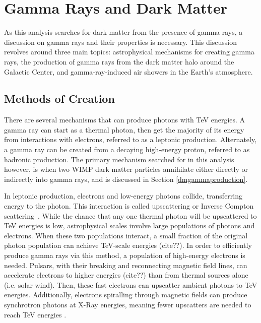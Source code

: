\cleartooddpage[\thispagestyle{empty}]
\chapter{Gamma Rays and Dark Matter}

As this analysis searches for dark matter from the presence of gamma rays, a discussion on gamma rays and their properties is necessary.
This discussion revolves around three main topics: astrophysical mechanisms for creating gamma rays, the production of gamma rays from the dark matter halo around the Galactic Center, and gamma-ray-induced air showers in the Earth's atmosphere.

\section{Methods of Creation}

  There are several mechanisms that can produce photons with TeV energies.
  A gamma ray can start as a thermal photon, then get the majority of its energy from interactions with electrons, referred to as a leptonic production.
  Alternately, a gamma ray can be created from a decaying high-energy proton, referred to as hadronic production.
  The primary mechanism searched for in this analysis however, is when two WIMP dark matter particles annihilate either directly or indirectly into gamma rays, and is discussed in Section \ref{dmgammaproduction}.

  In leptonic production, electrons and low-energy photons collide, transferring energy to the photon.
  This interaction is called upscattering or Inverse Compton scattering~\cite{compton_effect}.
  While the chance that any one thermal photon will be upscattered to TeV energies is low, astrophysical scales involve large populations of photons and electrons.
  When these two populations interact, a small fraction of the original photon population {\color{red}can achieve TeV-scale energies (cite??)}.
  In order to efficiently produce gamma rays via this method, a population of high-energy electrons is needed.
  Pulsars, with their breaking and reconnecting magnetic field lines, {\color{red}can accelerate electrons to higher energies (cite??)} than from thermal sources alone (i.e. solar wind).
  Then, these fast electrons can upscatter ambient photons to TeV energies.
  Additionally, electrons spiralling through magnetic fields can produce synchrotron photons at X-Ray energies, meaning fewer upscatters are needed to reach TeV energies \cite{self_compton}.

